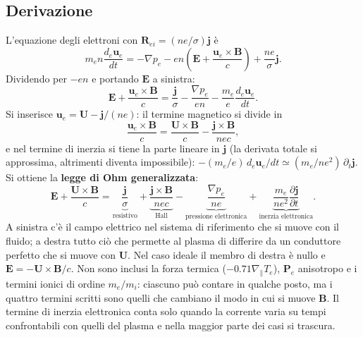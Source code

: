 \subsection{Derivazione}
L'equazione degli elettroni con $\mathbf{R}_{ei}=(ne/\sigma)\mathbf{j}$ è
\begin{equation}
m_en\frac{d_e\mathbf{u}_e}{dt}=-\nabla p_e-en\left(\mathbf{E}+\frac{\mathbf{u}_e\times\mathbf{B}}{c}\right)+\frac{ne}{\sigma}\mathbf{j}.
\end{equation}
Dividendo per $-en$ e portando $\mathbf{E}$ a sinistra:
\begin{equation}
\mathbf{E}+\frac{\mathbf{u}_e\times\mathbf{B}}{c}=\frac{\mathbf{j}}{\sigma}-\frac{\nabla p_e}{en}-\frac{m_e}{e}\frac{d_e\mathbf{u}_e}{dt}.
\end{equation}
Si inserisce $\mathbf{u}_e=\mathbf{U}-\mathbf{j}/(ne)$: il termine magnetico si divide in
\begin{equation}
\frac{\mathbf{u}_e\times\mathbf{B}}{c}=\frac{\mathbf{U}\times\mathbf{B}}{c}-\frac{\mathbf{j}\times\mathbf{B}}{nec},
\end{equation}
e nel termine di inerzia si tiene la parte lineare in $\mathbf{j}$ (la derivata totale si approssima, altrimenti diventa impossibile): $-(m_e/e)\,d_e\mathbf{u}_e/dt\simeq(m_e/ne^2)\,\partial_t\mathbf{j}$. Si ottiene la \textbf{legge di Ohm generalizzata}:
\begin{equation}
\mathbf{E}+\frac{\mathbf{U}\times\mathbf{B}}{c}=\underbrace{\frac{\mathbf{j}}{\sigma}}_{\text{resistivo}}+\underbrace{\frac{\mathbf{j}\times\mathbf{B}}{nec}}_{\text{Hall}}-\underbrace{\frac{\nabla p_e}{ne}}_{\text{pressione elettronica}}+\underbrace{\frac{m_e}{ne^2}\frac{\partial\mathbf{j}}{\partial t}}_{\text{inerzia elettronica}}.
\end{equation}
A sinistra c'è il campo elettrico nel sistema di riferimento che si muove con il fluido; a destra tutto ciò che permette al plasma di differire da un conduttore perfetto che si muove con $\mathbf{U}$. Nel caso ideale il membro di destra è nullo e $\mathbf{E}=-\mathbf{U}\times\mathbf{B}/c$. Non sono inclusi la forza termica ($-0.71\nabla_\parallel T_e$), $\mathbf{P}_e$ anisotropo e i termini ionici di ordine $m_e/m_i$: ciascuno può contare in qualche posto, ma i quattro termini scritti sono quelli che cambiano il modo in cui si muove $\mathbf{B}$. Il termine di inerzia elettronica conta solo quando la corrente varia su tempi confrontabili con quelli del plasma e nella maggior parte dei casi si trascura.

